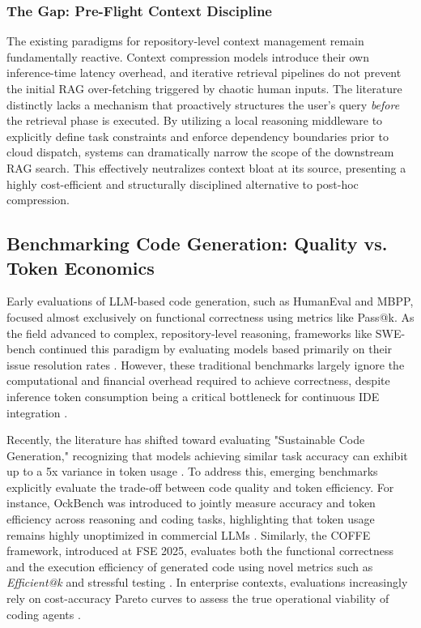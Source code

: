 \documentclass[11pt,a4paper,twocolumn]{article}
\begin{document}
\subsubsection*{The Gap: Pre-Flight Context Discipline}

The existing paradigms for repository-level context management remain fundamentally reactive. Context compression models introduce their own inference-time latency overhead, and iterative retrieval pipelines do not prevent the initial RAG over-fetching triggered by chaotic human inputs. The literature distinctly lacks a mechanism that proactively structures the user's query \textit{before} the retrieval phase is executed. By utilizing a local reasoning middleware to explicitly define task constraints and enforce dependency boundaries prior to cloud dispatch, systems can dramatically narrow the scope of the downstream RAG search. This effectively neutralizes context bloat at its source, presenting a highly cost-efficient and structurally disciplined alternative to post-hoc compression.

\subsection{Benchmarking Code Generation: Quality vs. Token Economics}

Early evaluations of LLM-based code generation, such as HumanEval and MBPP, focused almost exclusively on functional correctness using metrics like Pass@k. As the field advanced to complex, repository-level reasoning, frameworks like SWE-bench continued this paradigm by evaluating models based primarily on their issue resolution rates \cite{jimenez2024swebench}. However, these traditional benchmarks largely ignore the computational and financial overhead required to achieve correctness, despite inference token consumption being a critical bottleneck for continuous IDE integration \cite{du2026ockbench}.

Recently, the literature has shifted toward evaluating "Sustainable Code Generation," recognizing that models achieving similar task accuracy can exhibit up to a 5x variance in token usage \cite{du2026ockbench, ali2026sustainable}. To address this, emerging benchmarks explicitly evaluate the trade-off between code quality and token efficiency. For instance, OckBench was introduced to jointly measure accuracy and token efficiency across reasoning and coding tasks, highlighting that token usage remains highly unoptimized in commercial LLMs \cite{du2026ockbench}. Similarly, the COFFE framework, introduced at FSE 2025, evaluates both the functional correctness and the execution efficiency of generated code using novel metrics such as \textit{Efficient@k} and stressful testing \cite{peng2025coffe}. In enterprise contexts, evaluations increasingly rely on cost-accuracy Pareto curves to assess the true operational viability of coding agents \cite{chen2024modelcascading}.
\end{document}
